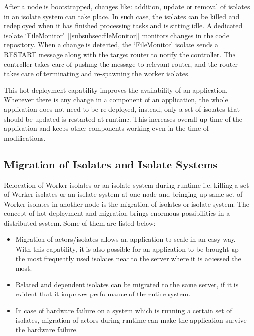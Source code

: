  After a node is bootstrapped, changes like: addition, update or removal of isolates in an isolate system can take place. In such case, the isolates can be killed and redeployed when it has finished processing tasks and is sitting idle. A dedicated isolate ‘FileMonitor’~[\autoref{subsubsec:fileMonitor}] monitors changes in the code repository. When a change is detected, the ‘FileMonitor’ isolate sends a RESTART message along with the target router to notify the controller. The controller takes care of pushing the message to relevant router, and the router takes care of terminating and re-spawning the worker isolates.

  This hot deployment capability improves the availability of an application. Whenever there is any change in a component of an application, the whole application does not need to be re-deployed, instead, only a set of isolates that should be updated is restarted at runtime. This increases overall up-time of the application and keeps other components working even in the time of modifications.

\subsection{Migration of Isolates and Isolate Systems}
  Relocation of Worker isolates or an isolate system during runtime i.e. killing a set of Worker isolates or an isolate system at one node and bringing up same set of Worker isolates in another node is the migration of isolates or isolate system. The concept of hot deployment and migration brings enormous possibilities in a distributed system. Some of them are listed below:

\begin{itemize}

  \item Migration of actors/isolates allows an application to scale in an easy way. With this capability, it is also possible for an application to be brought up the most frequently used isolates near to the server where it is accessed the most.

  \item Related and dependent isolates can be migrated to the same server, if it is evident that it improves performance of the entire system.

  \item In case of hardware failure on a system which is running a certain set of isolates, migration of actors during runtime can make the application survive the hardware failure.

\end{itemize}

